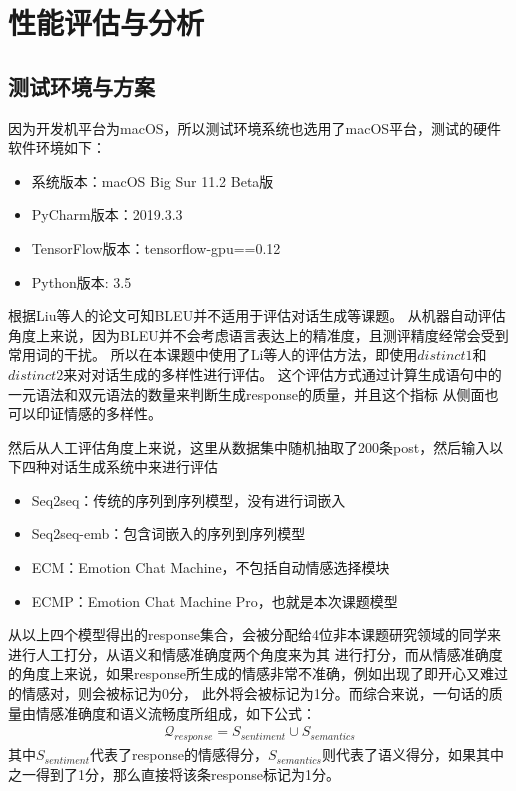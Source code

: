 \documentclass[supercite]{HustGraduPaper}
\theoremstyle{definition}
\begin{document}
\section{性能评估与分析}
\subsection{测试环境与方案}
因为开发机平台为macOS，所以测试环境系统也选用了macOS平台，测试的硬件软件环境如下：
\begin{itemize}
  \item 系统版本：macOS Big Sur 11.2 Beta版
  \item PyCharm版本：2019.3.3
  \item TensorFlow版本：tensorflow-gpu==0.12
  \item Python版本: 3.5
\end{itemize}

根据Liu\cite{liu-etal-2016-evaluate}等人的论文可知BLEU并不适用于评估对话生成等课题。
从机器自动评估角度上来说，因为BLEU并不会考虑语言表达上的精准度，且测评精度经常会受到常用词的干扰。
所以在本课题中使用了Li\cite{li2015diversity}等人的评估方法，即使用$distinct 1$和$distinct 2$来对对话生成的多样性进行评估。
这个评估方式通过计算生成语句中的一元语法和双元语法的数量来判断生成response的质量，并且这个指标
从侧面也可以印证情感的多样性。

然后从人工评估角度上来说，这里从数据集中随机抽取了200条post，然后输入以下四种对话生成系统中来进行评估
\begin{itemize}
  \item Seq2seq：传统的序列到序列模型，没有进行词嵌入
  \item Seq2seq-emb：包含词嵌入的序列到序列模型
  \item ECM：Emotion Chat Machine，不包括自动情感选择模块
  \item ECMP：Emotion Chat Machine Pro，也就是本次课题模型
\end{itemize}
从以上四个模型得出的response集合，会被分配给4位非本课题研究领域的同学来进行人工打分，从语义和情感准确度两个角度来为其
进行打分，而从情感准确度的角度上来说，如果response所生成的情感非常不准确，例如出现了即开心又难过的情感对，则会被标记为0分，
此外将会被标记为1分。而综合来说，一句话的质量由情感准确度和语义流畅度所组成，如下公式：
\begin{align}
  \mathcal{Q}_{response} = S_{sentiment} \cup S_{semantics} \label{5.1}
\end{align}
其中$S_{sentiment}$代表了response的情感得分，$S_{semantics}$则代表了语义得分，如果其中之一得到了1分，那么直接将该条response标记为1分。
\end{document}
